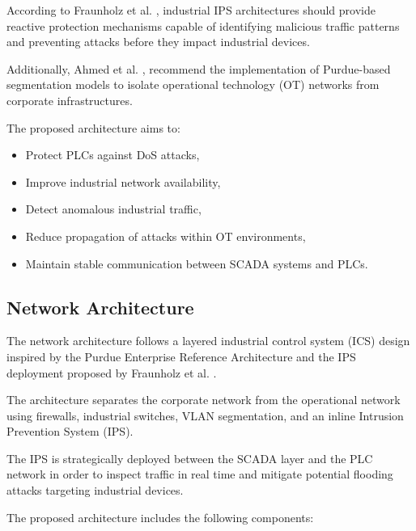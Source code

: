 \documentclass[sigconf]{acmart}
\begin{document}
According to Fraunholz et al. \cite{fraunholz2018industrial}, industrial IPS architectures should provide reactive protection mechanisms capable of identifying malicious traffic patterns and preventing attacks before they impact industrial devices.

Additionally, Ahmed et al. \cite{ahmed2019survey}, recommend the implementation of Purdue-based segmentation models to isolate operational technology (OT) networks from corporate infrastructures.

The proposed architecture aims to:
\begin{itemize}
    \item Protect PLCs against DoS attacks,
    \item Improve industrial network availability,
    \item Detect anomalous industrial traffic,
    \item Reduce propagation of attacks within OT environments,
    \item Maintain stable communication between SCADA systems and PLCs.
\end{itemize}

\subsection{Network Architecture}
The network architecture follows a layered industrial control system (ICS) design inspired by the Purdue Enterprise Reference Architecture and the IPS deployment proposed by Fraunholz et al. \cite{fraunholz2018industrial}.

The architecture separates the corporate network from the operational network using firewalls, industrial switches, VLAN segmentation, and an inline Intrusion Prevention System (IPS).

The IPS is strategically deployed between the SCADA layer and the PLC network in order to inspect traffic in real time and mitigate potential flooding attacks targeting industrial devices.

The proposed architecture includes the following components:
\end{document}
